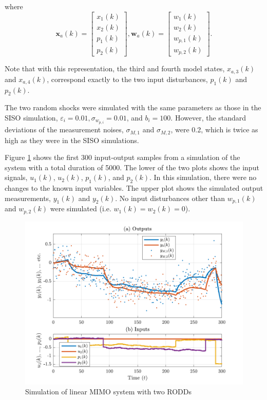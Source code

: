 where
\begin{equation} \label{eq:sim-sys-2x2-ss-aug2}
	\mathbf{x}_{a}(k) = \left[\begin{array}{l}
		x_{1}(k) \\
		x_{2}(k) \\
		p_{1}(k) \\
		p_{2}(k)
	\end{array}\right], \mathbf{w}_{a}(k) = \left[\begin{array}{l}
		w_1(k) \\
		w_2(k) \\
		w_{p,1}(k) \\
		w_{p,2}(k)
	\end{array}\right].
\end{equation}

Note that with this representation, the third and fourth model states, $x_{a,3}(k)$ and $x_{a,4}(k)$, correspond exactly to the two input disturbances, $p_1(k)$ and $p_2(k)$.

The two random shocks were simulated with the same parameters as those in the \gls{SISO} simulation, $\varepsilon_i=0.01, \sigma_{w_{p,i}}=0.01$, and $b_i=100$. However, the standard deviations of the measurement noises, $\sigma_{M,1}$ and $\sigma_{M,2}$, were 0.2, which is twice as high as they were in the \gls{SISO} simulations.

Figure \ref{fig:rod-obs-sim-2-ioplot} shows the first 300 input-output samples from a simulation of the system with a total duration of 5000. The lower of the two plots shows the input signals, $u_1(k)$, $u_2(k)$, $p_1(k)$, and $p_2(k)$. In this simulation, there were no changes to the known input variables. The upper plot shows the simulated output measurements, $y_1(k)$ and $y_2(k)$. No input disturbances other than $w_{p,1}(k)$ and $w_{p,2}(k)$ were simulated (i.e. $w_1(k)=w_2(k)=0$).
\begin{figure}[htp]
	\centering
	\includegraphics[width=13cm]{images/rod_obs_sim3_all_seed_ioplot.pdf}
	\caption{Simulation of linear MIMO system with two \gls{RODD}s}
	\label{fig:rod-obs-sim-2-ioplot}
\end{figure}

